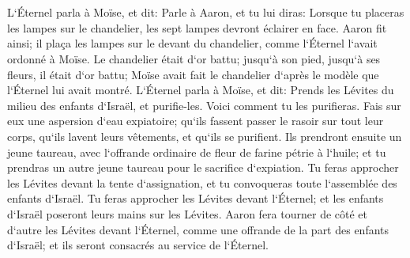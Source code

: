 \chapter{}

\verse L`Éternel parla à Moïse, et dit: 
\verse Parle à Aaron, et tu lui diras: Lorsque tu placeras les lampes sur le chandelier, les sept lampes devront éclairer en face. 
\verse Aaron fit ainsi; il plaça les lampes sur le devant du chandelier, comme l`Éternel l`avait ordonné à Moïse. 
\verse Le chandelier était d`or battu; jusqu`à son pied, jusqu`à ses fleurs, il était d`or battu; Moïse avait fait le chandelier d`après le modèle que l`Éternel lui avait montré. 
\verse L`Éternel parla à Moïse, et dit: 
\verse Prends les Lévites du milieu des enfants d`Israël, et purifie-les. 
\verse Voici comment tu les purifieras. Fais sur eux une aspersion d`eau expiatoire; qu`ils fassent passer le rasoir sur tout leur corps, qu`ils lavent leurs vêtements, et qu`ils se purifient. 
\verse Ils prendront ensuite un jeune taureau, avec l`offrande ordinaire de fleur de farine pétrie à l`huile; et tu prendras un autre jeune taureau pour le sacrifice d`expiation. 
\verse Tu feras approcher les Lévites devant la tente d`assignation, et tu convoqueras toute l`assemblée des enfants d`Israël. 
\verse Tu feras approcher les Lévites devant l`Éternel; et les enfants d`Israël poseront leurs mains sur les Lévites. 
\verse Aaron fera tourner de côté et d`autre les Lévites devant l`Éternel, comme une offrande de la part des enfants d`Israël; et ils seront consacrés au service de l`Éternel. 
